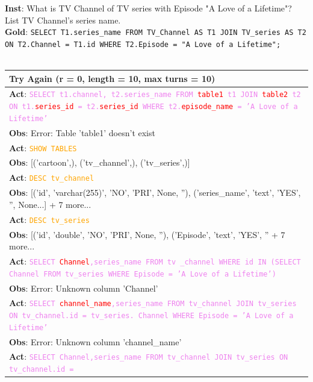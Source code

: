 \begin{table}
\footnotesize
\textbf{Inst}: What is TV Channel of TV series with Episode "A Love of a Lifetime"? List TV Channel's series name. \\
\textbf{Gold}: \texttt{SELECT T1.series\_name FROM TV\_Channel AS T1 JOIN TV\_series AS T2 ON T2.Channel = T1.id WHERE T2.Episode = "A Love of a Lifetime";} \\
\\
\begin{minipage}[t]{.49\linewidth}
\begin{tabularx}{\textwidth}{X}
\toprule
\textbf{Try Again} (r = 0, length = 10, max turns = 10) \\
\midrule
\textbf{Act}: \texttt{\textcolor{violet}{SELECT t1.channel, t2.series\_name FROM \textcolor{red}{table1} t1 JOIN \textcolor{red}{table2} t2 ON t1.\textcolor{red}{series\_id} = 
t2.\textcolor{red}{series\_id} WHERE t2.\textcolor{red}{episode\_name} = 'A Love of a Lifetime'}} \\
\textbf{Obs}: Error: Table 'table1' doesn't exist \\
\textbf{Act}: \textcolor{orange}{\texttt{SHOW TABLES}} \\
\textbf{Obs}: [('cartoon',), ('tv\_channel',), ('tv\_series',)] \\
\textbf{Act}: \textcolor{orange}{\texttt{DESC tv\_channel}} \\
\textbf{Obs}: [('id', 'varchar(255)', 'NO', 'PRI', None, ''), ('series\_name', 'text', 'YES', '', None...] + 7 
more... \\
\textbf{Act}: \textcolor{orange}{\texttt{DESC tv\_series}} \\
\textbf{Obs}: [('id', 'double', 'NO', 'PRI', None, ''), ('Episode', 'text', 'YES', '' + 7 more... \\
\textbf{Act}: \texttt{\textcolor{violet}{SELECT \textcolor{red}{Channel},series\_name FROM tv \_channel WHERE id IN (SELECT Channel FROM tv\_series 
WHERE Episode = 'A Love of a Lifetime')}} \\
\textbf{Obs}: Error: Unknown column 'Channel' \\
\textbf{Act}: \textcolor{violet}{\texttt{SELECT \textcolor{red}{channel\_name},series\_name FROM tv\_channel JOIN tv\_series ON tv\_channel.id = 
tv\_series. Channel WHERE Episode = 'A Love of a Lifetime'}} \\
\textbf{Obs}: Error: Unknown column 'channel\_name' \\
\textbf{Act}: \textcolor{violet}{\texttt{SELECT Channel,series\_name FROM tv\_channel JOIN tv\_series ON tv\_channel.id = 
}}
\end{tabularx}
\end{minipage}
\end{table}
